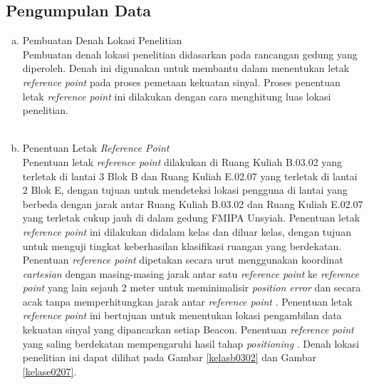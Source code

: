 \subsection{Pengumpulan Data}
\begin{enumerate}[a.]
\itemsep0em
\item Pembuatan Denah Lokasi Penelitian
\\
Pembuatan denah lokasi penelitian didasarkan pada rancangan gedung yang diperoleh. Denah ini digunakan untuk membantu dalam menentukan letak \textit{reference point} pada proses pemetaan kekuatan sinyal. Proses penentuan letak \textit{reference point} ini dilakukan dengan cara menghitung luas lokasi penelitian.
\\
\\
\item Penentuan Letak \textit{Reference Point}
\\
Penentuan letak \textit{reference point} dilakukan di Ruang Kuliah B.03.02 yang terletak di lantai 3 Blok B dan Ruang Kuliah E.02.07 yang terletak di lantai 2 Blok E, dengan tujuan untuk mendeteksi lokasi pengguna di lantai yang berbeda dengan jarak antar Ruang Kuliah B.03.02 dan Ruang Kuliah E.02.07 yang terletak cukup jauh di dalam gedung FMIPA Unsyiah. Penentuan letak \textit{reference point} ini dilakukan didalam kelas dan diluar kelas, dengan tujuan untuk menguji tingkat keberhasilan klasifikasi ruangan yang berdekatan. Penentuan \textit{reference point} dipetakan secara urut menggunakan koordinat \textit{cartesian} dengan masing-masing jarak antar satu \textit{reference point} ke \textit{reference point} yang lain sejauh 2 meter untuk meminimalisir \textit{position error} \citep{Lee2019} dan secara acak tanpa memperhitungkan jarak antar \textit{reference point} \citep{Bahl2000}. Penentuan letak \textit{reference point} ini bertujuan untuk menentukan lokasi pengambilan data kekuatan sinyal yang dipancarkan setiap Beacon. Penentuan \textit{reference point} yang saling berdekatan mempengaruhi hasil tahap \textit{positioning} \citep{darshan2012}. Denah lokasi penelitian ini dapat dilihat pada Gambar \ref{kelasb0302} dan Gambar \ref{kelase0207}.


\end{enumerate}
